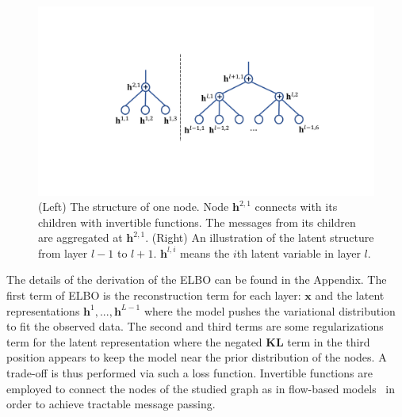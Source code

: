 \documentclass{article} %
\begin{document}
\begin{figure}
\begin{center}
 \includegraphics[width=1.0\linewidth]{fig/node.pdf}
\end{center}
\vspace{-0.2in}
\caption{ {\small (Left) The structure of one node. Node $\mathbf{h}^{2, 1}$ connects with its children with invertible functions. The messages from its children are aggregated at $\mathbf{h}^{2,1}$. (Right) An illustration of the latent structure from layer $l-1$ to $l+1$.  $\mathbf{h}^{l, i}$ means the $i$th latent variable  in layer $l$.}}
\label{fig:node_tree}
\vspace{-0.15in}
\end{figure}
The details of the derivation of the ELBO can be found in the Appendix. 
The first term of ELBO is the reconstruction term for each layer: $\mathbf{x}$ and the latent representations $\mathbf{h}^1, ..., \mathbf{h}^{L-1}$ where the model pushes the variational distribution to fit the observed data. 
The second and third terms are some regularizations term for the latent representation where the negated \textbf{KL} term in the third position appears to keep the model near the prior distribution of the nodes. 
A trade-off is thus performed via such a loss function.
Invertible functions are employed to connect the nodes of the studied graph as in flow-based models~\citep{Dinh2016DensityEU} in order to achieve tractable message passing. 
\end{document}
